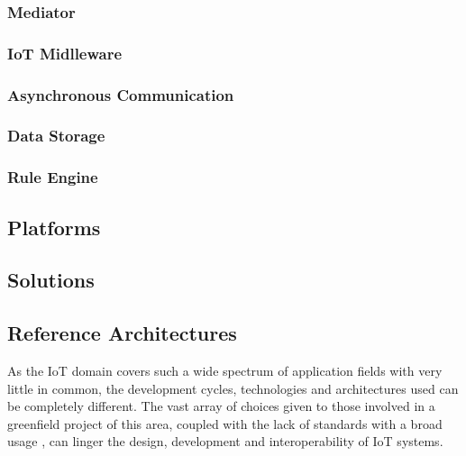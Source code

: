 \subsubsection{Mediator}
\label{subsubsec:stateofart:arch:infra:mediator}

\subsubsection{IoT Midlleware}
\label{subsubsec:stateofart:arch:infra:middleware}

\subsubsection{Asynchronous Communication}
\label{subsubsec:stateofart:arch:infra:async}

\subsubsection{Data Storage}
\label{subsubsec:stateofart:arch:infra:store}

\subsubsection{Rule Engine}
\label{subsubsec:stateofart:arch:infra:rule}

\subsection{Platforms}
\label{subsec:stateofart:arch:platforms}

\subsection{Solutions}
\label{subsec:stateofart:arch:solutions}

\subsection{Reference Architectures}
\label{subsec:stateofart:arch:ref}

As the \gls{IoT} domain covers such a wide spectrum of application fields with very little in common, the development cycles, technologies and architectures used can be completely different. The vast array of choices given to those involved in a greenfield project of this area, coupled with the lack of standards with a broad usage \parencite{DIAS2022100529, weyrich2015reference}, can linger the design, development and interoperability of \gls{IoT} systems.

